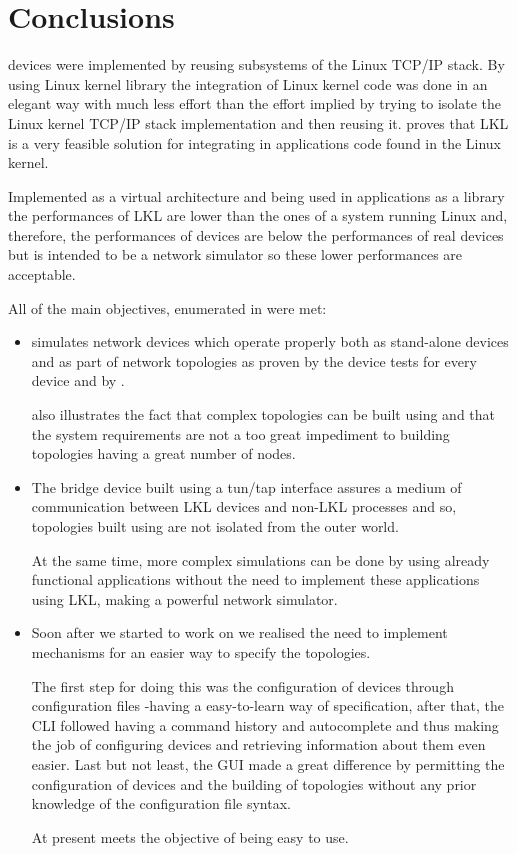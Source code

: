 \chapter{Conclusions}
\label{chapter:conclusions}

\project devices were implemented by reusing subsystems of the Linux TCP/IP stack. By using Linux kernel library the integration of Linux kernel code was done in an elegant way with much less effort than the effort implied by trying to isolate the Linux kernel TCP/IP stack implementation and then reusing it. \project proves that LKL is a very feasible solution for integrating in applications code found in the Linux kernel.

Implemented as a virtual architecture and being used in applications as a library the performances of LKL are lower than the ones of a system running Linux and, therefore, the performances of \project devices are below the performances of real devices but \project is intended to be a network simulator so these lower performances are acceptable.

All of the main objectives, enumerated in  were met:
\begin{itemize}
\item \project simulates network devices which operate properly both as stand-alone devices and as part of network topologies as proven by the device tests for every device and by .

 also illustrates the fact that complex topologies can be built using \project and that the system requirements are not a too great impediment to building topologies having a great number of nodes.
\item The bridge device built using a tun/tap interface assures a medium of communication between LKL devices and non-LKL processes and so, topologies built using \project are not isolated from the outer world. 

At the same time, more complex simulations can be done by using already functional applications without the need to implement these applications using LKL, making \project a powerful network simulator.
\item  Soon after we started to work on \project we realised the need to implement mechanisms for an easier way to specify the topologies.

The first step for doing this was the configuration of devices through configuration files -having a easy-to-learn way of specification, after that, the CLI followed having a command history and autocomplete and thus making the job of configuring devices and retrieving information about them even easier. Last but not least, the GUI made a great difference by permitting the configuration of devices and the building of topologies without any prior knowledge of the configuration file syntax.

At present \project meets the objective of being easy to use. 
\end{itemize}

